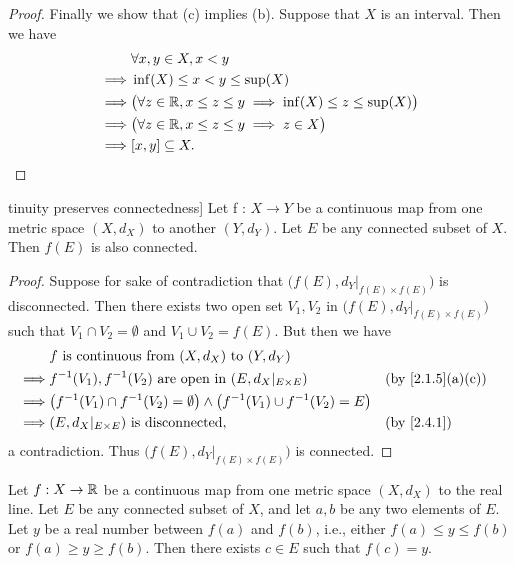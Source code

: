 \begin{proof}
  Finally we show that (c) implies (b).
  Suppose that \(X\) is an interval.
  Then we have
  \begin{align*}
             & \forall x, y \in X, x < y                                                        \\
    \implies & \inf(X) \leq x < y \leq \sup(X)                                                  \\
    \implies & \big(\forall z \in \mathbb{R}, x \leq z \leq y \implies \inf(X) \leq z \leq \sup(X)\big) \\
    \implies & \big(\forall z \in \mathbb{R}, x \leq z \leq y \implies z \in X\big)                     \\
    \implies & [x, y] \subseteq X.
  \end{align*}
\end{proof}

\begin{thm}tinuity preserves connectedness]\label{2.4.6}
  Let f : \(X \to Y\) be a continuous map from one metric space \((X, d_X)\) to another \((Y, d_Y)\).
  Let \(E\) be any connected subset of \(X\).
  Then \(f(E)\) is also connected.
\end{thm}

\begin{proof}
  Suppose for sake of contradiction that \(\big(f(E), d_Y|_{f(E) \times f(E)}\big)\) is disconnected.
  Then there exists two open set \(V_1, V_2\) in \(\big(f(E), d_Y|_{f(E) \times f(E)}\big)\) such that \(V_1 \cap V_2 = \emptyset\) and \(V_1 \cup V_2 = f(E)\).
  But then we have
  \begin{align*}
             & f \text{ is continuous from } (X, d_X) \text{ to } (Y, d_Y)                                                                             \\
    \implies & f^{-1}(V_1), f^{-1}(V_2) \text{ are open in } (E, d_X|_{E \times E})                                &  & \text{(by \cref{2.1.5}(a)(c))} \\
    \implies & \big(f^{-1}(V_1) \cap f^{-1}(V_2) = \emptyset\big) \land \big(f^{-1}(V_1) \cup f^{-1}(V_2) = E\big)                                     \\
    \implies & (E, d_X|_{E \times E}) \text{ is disconnected},                                                     &  & \by{2.4.1}
  \end{align*}
  a contradiction.
  Thus \(\big(f(E), d_Y|_{f(E) \times f(E)}\big)\) is connected.
\end{proof}

\begin{cor}\label{2.4.7}
  Let \(f : X \to \mathbb{R}\) be a continuous map from one metric space \((X, d_X)\) to the real line.
  Let \(E\) be any connected subset of \(X\), and let \(a, b\) be any two elements of \(E\).
  Let \(y\) be a real number between \(f(a)\) and \(f(b)\), i.e., either \(f(a) \leq y \leq f(b)\) or \(f(a) \geq y \geq f(b)\).
  Then there exists \(c \in E\) such that \(f(c) = y\).
\end{cor}

